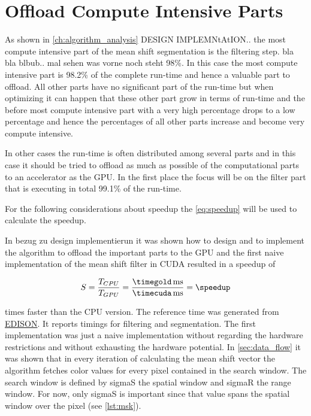 \section{Offload Compute Intensive Parts}
\label{sec:offload_intensive}

As shown in \autoref{ch:algorithm_analysis} {\color{red} DESIGN IMPLEMNtAtION..}
the most compute intensive part of the mean shift segmentation is the filtering
step. bla bla blbub.. mal sehen was vorne noch steht 98\%. In this case the most
compute intensive part is 98.2\% of the complete run-time and hence a valuable
part to offload. All other parts have no significant part of the run-time but
when optimizing it can happen that these other part grow in terms of run-time
and the before most compute intensive part with a very high percentage drops to
a low percentage and hence the percentages of all other parts increase and
become very compute intensive. 

In other cases the run-time is often distributed among several parts and in this
case it should be tried to offload as much as possible of the computational parts
to an accelerator as the \gls{GPU}. In the first place the focus will be on the
filter part that is executing in total 99.1\% of the run-time.

For the following considerations about speedup the \autoref{eq:speedup} will be
used to calculate the speedup. 

In {\color{red} bezug zu design implementierun} it was shown how to design and
to implement the algorithm to offload the important parts to the \gls{GPU} and
the first naive implementation of the mean shift filter in \gls{CUDA} resulted
in a speedup of

\begin{equation*}\label{eq:speedup0}
	S = \frac{T_{CPU}}{T_{GPU}} = %
	\frac{\unit[\timegold]{ms}}{\unit[\timecuda]{ms}} = \speedup
\end{equation*}

times faster than the \gls{CPU} version. The reference time was generated from
\href{http://www.caip.rutgers.edu/riul/research/code.html}{ \gls{EDISON}}. It
reports timings for filtering and segmentation.
The first implementation was just a naive implementation without regarding the
hardware restrictions and without exhausting the hardware potential. In
\autoref{sec:data_flow} it was shown that in every iteration of calculating the
mean shift vector the algorithm fetches color values for every pixel contained
in the search window. The search window is defined by \textsf{sigmaS} the
spatial window and \textsf{sigmaR} the range window. For now, only
\textsf{sigmaS} is important since that value spans the spatial window over
the pixel (see \autoref{lst:msk}). 



